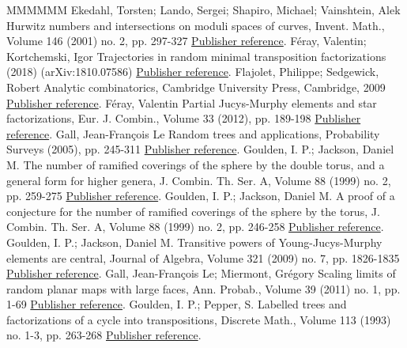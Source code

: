 \begin{thebibliography}{MMMMMM}
 Ekedahl, Torsten; Lando, Sergei; Shapiro, Michael; Vainshtein, Alek Hurwitz numbers and intersections on moduli spaces of curves, Invent. Math., Volume 146 (2001) no. 2, pp. 297-327 \href{https://ahl.centre-mersenne.org/item/AHL_2018__1__149_0/#ELSV}{Publisher reference}.
 Féray, Valentin; Kortchemski, Igor Trajectories in random minimal transposition factorizations (2018) (arXiv:1810.07586) \href{https://ahl.centre-mersenne.org/item/AHL_2018__1__149_0/#FK18}{Publisher reference}.
 Flajolet, Philippe; Sedgewick, Robert Analytic combinatorics, Cambridge University Press, Cambridge, 2009 \href{https://ahl.centre-mersenne.org/item/AHL_2018__1__149_0/#FS09}{Publisher reference}.
 Féray, Valentin Partial Jucys-Murphy elements and star factorizations, Eur. J. Combin., Volume 33 (2012), pp. 189-198 \href{https://ahl.centre-mersenne.org/item/AHL_2018__1__149_0/#Fer12}{Publisher reference}.
 Gall, Jean-François Le Random trees and applications, Probability Surveys (2005), pp. 245-311 \href{https://ahl.centre-mersenne.org/item/AHL_2018__1__149_0/#LG05}{Publisher reference}.
 Goulden, I. P.; Jackson, Daniel M. The number of ramified coverings of the sphere by the double torus, and a general form for higher genera, J. Combin. Th. Ser. A, Volume 88 (1999) no. 2, pp. 259-275 \href{https://ahl.centre-mersenne.org/item/AHL_2018__1__149_0/#GJ99B}{Publisher reference}.
 Goulden, I. P.; Jackson, Daniel M. A proof of a conjecture for the number of ramified coverings of the sphere by the torus, J. Combin. Th. Ser. A, Volume 88 (1999) no. 2, pp. 246-258 \href{https://ahl.centre-mersenne.org/item/AHL_2018__1__149_0/#GJ99A}{Publisher reference}.
 Goulden, I. P.; Jackson, Daniel M. Transitive powers of Young-Jucys-Murphy elements are central, Journal of Algebra, Volume 321 (2009) no. 7, pp. 1826-1835 \href{https://ahl.centre-mersenne.org/item/AHL_2018__1__149_0/#GouldenJackson2009}{Publisher reference}.
 Gall, Jean-François Le; Miermont, Grégory Scaling limits of random planar maps with large faces, Ann. Probab., Volume 39 (2011) no. 1, pp. 1-69 \href{https://ahl.centre-mersenne.org/item/AHL_2018__1__149_0/#LGM09}{Publisher reference}.
 Goulden, I. P.; Pepper, S. Labelled trees and factorizations of a cycle into transpositions, Discrete Math., Volume 113 (1993) no. 1-3, pp. 263-268 \href{https://ahl.centre-mersenne.org/item/AHL_2018__1__149_0/#GP93}{Publisher reference}.

\end{thebibliography}
